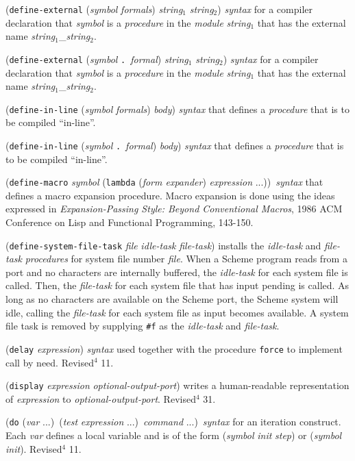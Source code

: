 \documentclass[10pt,twocolumn]{article}
\begin{document}
(\texttt{define-external} (\emph{symbol} \emph{formals}) \emph{string}$_1$
\emph{string}$_2$) \emph{syntax} for a compiler declaration that
\emph{symbol} is a \emph{procedure} in the \emph{module} \emph{string}$_1$ that
has the external name \emph{string}$_1$\_\emph{string}$_2$.

(\texttt{define-external} (\emph{symbol} \texttt{.}\ \emph{formal}) \emph{string}$_1$
\emph{string}$_2$) \emph{syntax} for a compiler declaration that
\emph{symbol} is a \emph{procedure} in the \emph{module} \emph{string}$_1$ that
has the external name \emph{string}$_1$\_\emph{string}$_2$.

(\texttt{define-in-line} (\emph{symbol} \emph{formals}) \emph{body}) \emph{syntax}
that defines a \emph{procedure} that is to be compiled ``in-line''.

(\texttt{define-in-line} (\emph{symbol} \texttt{.}\ \emph{formal}) \emph{body})
\emph{syntax} that defines a \emph{procedure} that is to be compiled
``in-line''.

(\texttt{define-macro} \emph{symbol} (\texttt{lambda} (\emph{form expander})
\emph{expression} ...))\ \emph{syntax} that defines a macro expansion
procedure.  Macro expansion is done using the ideas expressed in
\emph{Expansion-Passing Style: Beyond Conventional Macros}, 1986 ACM
Conference on Lisp and Functional Programming, 143-150.

(\texttt{define-system-file-task} \emph{file} \emph{idle-task}
\emph{file-task}) installs the \emph{idle-task} and \emph{file-task}
\emph{procedures} for system file number \emph{file}.  When a Scheme
program reads from a port and no characters are internally
buffered, the \emph{idle-task} for each system file is called.
Then, the \emph{file-task} for each system file that has input
pending is called.  As long as no characters are available on
the Scheme port, the Scheme system will idle, calling the
\emph{file-task} for each system file as input becomes available.
A system file task is removed by supplying \texttt{\#f} as the
\emph{idle-task} and \emph{file-task}.

(\texttt{delay} \emph{expression}) \emph{syntax} used together with the
procedure \texttt{force} to implement call by need.  Revised$^4$ 11.

(\texttt{display} \emph{expression} \emph{optional-output-port}) writes a
human-readable representation of \emph{expression} to
\emph{optional-output-port}.  Revised$^4$ 31.

(\texttt{do} (\emph{var} ...)\ (\emph{test} \emph{expression} ...)\ \emph{command} ...)\
\emph{syntax} for an iteration construct.  Each \emph{var} defines a local
variable and is of the form (\emph{symbol} \emph{init} \emph{step}) or
(\emph{symbol} \emph{init}).  Revised$^4$ 11.
\end{document}

